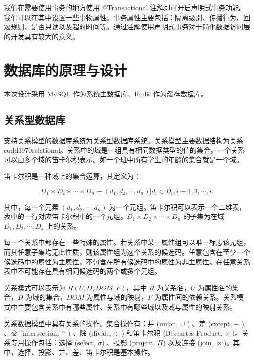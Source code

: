  我们在需要使用事务的地方使用 @Transactional\cite{spring2019} 注解即可开启声明式事务功能。我们可以在其中设置一些事物属性。事务属性主要包括：隔离级别、传播行为、回滚规则、是否只读以及超时时间等。通过注解使用声明式事务对于简化数据访问层的开发具有较大的意义\cite{walls2016spring}。


\section{数据库的原理与设计}

本次设计采用 MySQL 作为系统主数据库、Redis 作为缓存数据库。


\subsection{关系型数据库}
支持关系模型的数据库系统为关系型数据库系统。关系模型主要数据结构为关系{codd1970relational}。关系中的域是一组具有相同数据类型的值的集合。一个关系可以由多个域的笛卡尔积表示。如一个班中所有学生的年龄的集合就是一个域\cite{王珊2006数据库系统概论}。

笛卡尔积是一种域上的集合运算，其定义为：

\begin{equation}
\label{eq:Descartes}
D_1 \times D_2 \times \cdots \times D_n = {(d_1, d_2, \cdots, d_n) | d_i \in D_i, i=1, 2, \cdots, n}
\end{equation}

其中，每一个元素 $(d_1, d_2, \cdots, d_n)$ 为一个元组。笛卡尔积可以表示一个二维表，表中的一行对应笛卡尔积中的一个元组。$D_1 \times D_2 \times \cdots \times D_n$ 的子集为在域 $D_1, D_2, \cdots, D_n$ 上的关系\cite{codd1970relational}。

每一个关系中都存在一些特殊的属性。若关系中某一属性组可以唯一标志该元组，而其任意子集均无此性质，则该属性组为这个关系的候选码。任意包含在至少一个候选码中的属性为主属性，不包含在所有候选码中的属性为非主属性。在任意关系表中不可能存在具有相同候选码的两个或多个元组\cite{codd1970relational,王珊2006数据库系统概论}。

关系模式可以表示为 $R(U, D, DOM, F)$，其中 $R$ 为关系名，$U$ 为属性名的集合，$D$ 为域的集合，$DOM$ 为属性与域的映射，$F$ 为属性间的依赖关系。关系模式中主要包含关系中有哪些属性、关系中有哪些域以及域与属性的映射关系。

关系数据模型中具有关系的操作。集合操作有：并 (union, $\cup$ ) 、差 (except, $-$ ) 、交 (intersection, $\cap$ ) 、除 (divide, $\div$ ) 和笛卡尔积 (Descartes Product, $\times$ )。关系专用操作包括：选择 (select, $\sigma$) 、投影 (project, $\Pi$) 以及连接 (join, $\Join $)。其中，选择、投影、并、差、笛卡尔积是基本操作\cite{ullman1984principles}。

